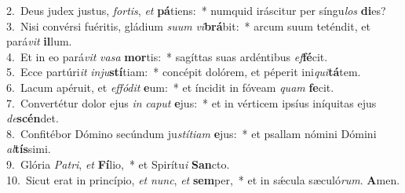{2.~}Deus judex justus, \textit{for}\textit{tis}, \textit{et} \textbf{pá}tiens:~* numquid iráscitur per síngu\textit{los} \textbf{di}es?\\
{3.~}Nisi convérsi fuéritis, gládium \textit{su}\textit{um} \textit{vi}\textbf{brá}bit:~* arcum suum teténdit, et pará\textit{vit} \textbf{il}lum.\\
{4.~}Et in eo pará\textit{vit} \textit{va}\textit{sa} \textbf{mor}tis:~* sagíttas suas ardéntibus \textit{ef}\textbf{fé}cit.\\
{5.~}Ecce partúri\textit{it} \textit{in}\textit{ju}\textbf{stí}tiam:~* concépit dolórem, et péperit ini\textit{qui}\textbf{tá}tem.\\
{6.~}Lacum apéruit, et \textit{ef}\textit{fó}\textit{dit} \textbf{e}um:~* et íncidit in fóveam \textit{quam} \textbf{fe}cit.\\
{7.~}Convertétur dolor ejus \textit{in} \textit{ca}\textit{put} \textbf{e}jus:~* et in vérticem ipsíus iníquitas ejus \textit{de}\textbf{scén}det.\\
{8.~}Confitébor Dómino secúndum ju\textit{stí}\textit{ti}\textit{am} \textbf{e}jus:~* et psallam nómini Dómini \textit{al}\textbf{tís}simi.\\
{9.~}Glória \textit{Pa}\textit{tri}, \textit{et} \textbf{Fí}lio,~* et Spirítu\textit{i} \textbf{San}cto.\\
{10.~}Sicut erat in princípio, \textit{et} \textit{nunc}, \textit{et} \textbf{sem}per,~* et in sǽcula sæculó\textit{rum}. \textbf{A}men.\\
